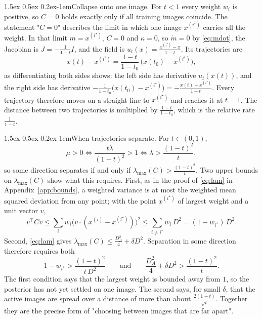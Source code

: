\documentclass{article}
\makeatletter
\renewcommand{\normalsize}{\fontsize{10pt}{11pt}\selectfont}
\renewcommand{\paragraph}{\@startsection{paragraph}{4}{\z@}%
  {1.5ex \@plus 0.5ex \@minus 0.2ex}{-1em}{\normalsize\bfseries}}
\theoremstyle{remark}
\newcommand{\xn}[1]{x^{(#1)}}
\newcommand{\lmax}{\lambda_{\max}}
\makeatother
\begin{document}
\paragraph{Collapse onto one image.} For $t < 1$ every weight $w_i$ is positive, so $C = 0$ holds exactly only if all training images coincide. The statement "$C = 0$" describes the limit in which one image $\xn{i^\star}$ carries all the weight. In that limit $m = \xn{i^\star}$, $C = 0$ and $\kappa = 0$, so $\dot m = 0$ by \eqref{eq:mdot}, the Jacobian is $J = -\frac{1}{1 - t}I$, and the field is $u_t(x) = \frac{\xn{i^\star} - x}{1 - t}$. Its trajectories are
$$
  x(t) - \xn{i^\star} = \frac{1 - t}{1 - t_0}\,\big(x(t_0) - \xn{i^\star}\big),
$$
as differentiating both sides shows: the left side has derivative $u_t(x(t))$, and the right side has derivative $-\frac{1}{1 - t_0}\big(x(t_0) - \xn{i^\star}\big) = -\frac{x(t) - \xn{i^\star}}{1 - t}$. Every trajectory therefore moves on a straight line to $\xn{i^\star}$ and reaches it at $t = 1$. The distance between two trajectories is multiplied by $\frac{1 - t}{1 - t_0}$, which is the relative rate $\frac{1}{1 - t}$.

\paragraph{When trajectories separate.} For $t \in (0,1)$,
$$
  \mu > 0 \iff \frac{t\lambda}{(1 - t)^2} > 1 \iff \lambda > \frac{(1 - t)^2}{t},
$$
so some direction separates if and only if $\lmax(C) > \frac{(1 - t)^2}{t}$. Two upper bounds on $\lmax(C)$ show what this requires. First, as in the proof of \eqref{eq:lam} in Appendix~\ref{app:bounds}, a weighted variance is at most the weighted mean squared deviation from any point; with the point $\xn{i^\star}$ of largest weight and a unit vector $v$,
$$
  v^\top Cv \le \sum_iw_i\big(v \cdot (\xn{i} - \xn{i^\star})\big)^2 \le \sum_{i \ne i^\star}w_i\,D^2 = (1 - w_{i^\star})\,D^2 .
$$
Second, \eqref{eq:lam} gives $\lmax(C) \le \frac{D_A^2}{4} + \delta D^2$. Separation in some direction therefore requires both
$$
  1 - w_{i^\star} > \frac{(1 - t)^2}{t\,D^2}\qquad\text{and}\qquad \frac{D_A^2}{4} + \delta D^2 > \frac{(1 - t)^2}{t}.
$$
The first condition says that the largest weight is bounded away from $1$, so the posterior has not yet settled on one image. The second says, for small $\delta$, that the active images are spread over a distance of more than about $\frac{2(1 - t)}{\sqrt t}$. Together they are the precise form of "choosing between images that are far apart".
\end{document}
